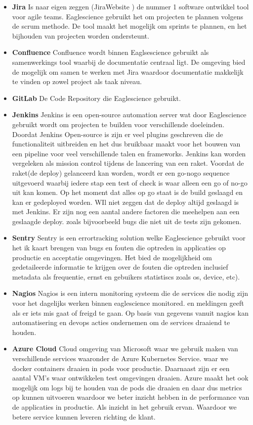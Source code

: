 \begin{itemize}
\item \textbf{Jira} Is naar eigen zeggen (JiraWebsite ) de nummer 1 software ontwikkel tool voor agile teams. Eaglescience gebruikt het om projecten te plannen volgens de scrum methode. De tool maakt het mogelijk om sprints te plannen, en het bijhouden van projecten worden ondersteunt.
\item \textbf{Confluence}
Confluence wordt binnen Eaglsescience gebruikt als samenwerkings tool waarbij de documentatie centraal ligt. De omgeving bied de mogelijk om samen te werken met Jira waardoor documentatie makkelijk te vinden op zowel project als taak niveau.
\item \textbf{GitLab}
De Code Repository die Eaglescience gebruikt.
\item \textbf{Jenkins}
Jenkins is een open-source automation server wat door Eaglescience gebruikt wordt om projecten te builden voor verschillende doeleinden. Doordat Jenkins Open-source is zijn er veel plugins geschreven die de functionaliteit uitbreiden en het dus bruikbaar maakt voor het bouwen van een pipeline voor veel verschillende talen en frameworks.
Jenkins kan worden vergeleken als mission control tijdens de lancering van een raket. Voordat de raket(de deploy) gelanceerd kan worden, wordt er een go-nogo sequence uitgevoerd waarbij iedere stap een test of check is waar alleen een go of no-go uit kan komen. Op het moment dat alles op go staat is de build geslaagd en kan er gedeployed worden. WIl niet zeggen dat de deploy altijd geslaagd is met Jenkins. Er zijn nog een aantal andere factoren die meehelpen aan een geslaagde deploy. zoals bijvoorbeeld bugs die niet uit de tests zijn gekomen.
\item \textbf{Sentry}
Sentry is een errortracking solution welke Eaglescience gebruikt voor het ik kaart brengen van bugs en fouten die optreden in applicaties op productie en acceptatie omgevingen. Het bied de mogelijkheid om gedetaileerde informatie te krijgen over de fouten die optreden inclusief metadata als frequentie, ernst en gebuikers statistiscs zoals os, device, etc).
\item \textbf{Nagios}
Nagios is een intern monitoring systeem die de services die nodig zijn voor het dagelijks werken binnen eaglescience monitored. en meldingen geeft als er iets mis gaat of freigd te gaan. Op basis van gegevens vanuit nagios kan automatisering en devops acties ondernemen om de services draaiend te houden.
\item \textbf{Azure Cloud}
Cloud omgeving van Microsoft waar we gebruik maken van verschillende services waaronder de Azure Kubernetes Service. waar we docker containers draaien in pods voor productie. Daarnaast zijn er een aantal VM's waar ontwikkelen test omgevingen draaien. Azure maakt het ook mogelijk om logs bij te houden van de pods die draaien en daar dus metrics op kunnen uitvoeren waardoor we beter inzicht hebben in de performance van de applicaties in productie. Als inzicht in het gebruik ervan. Waardoor we betere service kunnen leveren richting de klant.
\end{itemize}

